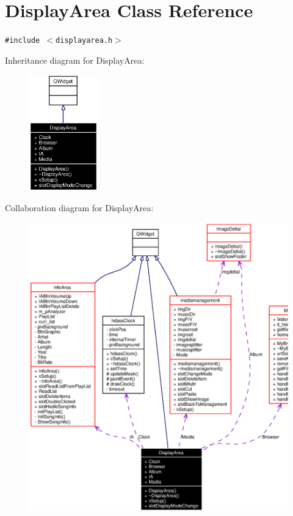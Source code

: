 \section{Display\-Area Class Reference}
\label{classDisplayArea}
{\tt \#include $<$displayarea.h$>$}

Inheritance diagram for Display\-Area:\begin{figure}[H]
\begin{center}
\leavevmode
\includegraphics[width=84pt]{classDisplayArea__inherit__graph}
\end{center}
\end{figure}
Collaboration diagram for Display\-Area:\begin{figure}[H]
\begin{center}
\leavevmode
\includegraphics[width=335pt]{classDisplayArea__coll__graph}
\end{center}
\end{figure}


